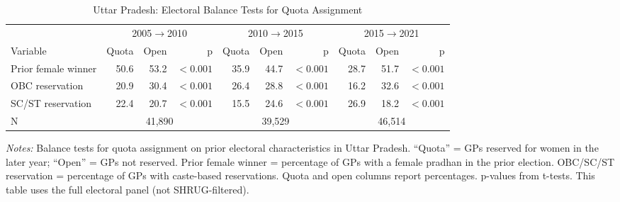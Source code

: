 \begin{table}[htbp]
\caption{Uttar Pradesh: Electoral Balance Tests for Quota Assignment}
\label{tab:balance_electoral_up}
{\centering\scriptsize
\begin{tabular}{@{}lrrr rrr rrr@{}}
\toprule
& \multicolumn{3}{c}{2005$\rightarrow$2010} & \multicolumn{3}{c}{2010$\rightarrow$2015} & \multicolumn{3}{c}{2015$\rightarrow$2021} \\
\cmidrule(lr){2-4} \cmidrule(lr){5-7} \cmidrule(lr){8-10}
Variable & Quota & Open & p & Quota & Open & p & Quota & Open & p \\
\midrule
Prior female winner & 50.6 & 53.2 & $<0.001$ & 35.9 & 44.7 & $<0.001$ & 28.7 & 51.7 & $<0.001$ \\
OBC reservation & 20.9 & 30.4 & $<0.001$ & 26.4 & 28.8 & $<0.001$ & 16.2 & 32.6 & $<0.001$ \\
SC/ST reservation & 22.4 & 20.7 & $<0.001$ & 15.5 & 24.6 & $<0.001$ & 26.9 & 18.2 & $<0.001$ \\
\midrule
N & \multicolumn{3}{c}{41,890} & \multicolumn{3}{c}{39,529} & \multicolumn{3}{c}{46,514} \\
\bottomrule
\end{tabular}
\par}

\vspace{0.5ex}
\parbox{\linewidth}{\scriptsize \emph{Notes:} Balance tests for quota assignment on prior electoral characteristics in Uttar Pradesh. ``Quota'' = GPs reserved for women in the later year; ``Open'' = GPs not reserved. Prior female winner = percentage of GPs with a female pradhan in the prior election. OBC/SC/ST reservation = percentage of GPs with caste-based reservations. Quota and open columns report percentages. p-values from t-tests. This table uses the full electoral panel (not SHRUG-filtered).}
\end{table}
